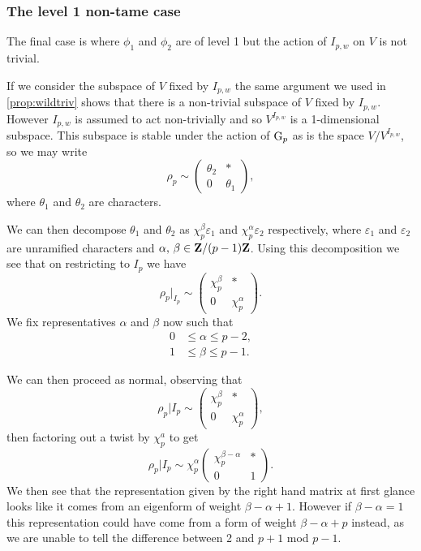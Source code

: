 \documentclass[a4paper,12pt]{article}
\begin{document}
\subsubsection{The level 1 non-tame case}\label{sec:l1nt}
The final case is where $\phi_1$ and $\phi_2$ are of level 1 but the action of $I_{p,w}$ on $V$ is not trivial.

If we consider the subspace of $V$ fixed by $I_{p,w}$ the same argument we used in \cref{prop:wildtriv} shows that there is a non-trivial subspace of $V$ fixed by $I_{p,w}$.
However $I_{p,w}$ is assumed to act non-trivially and so $V^{I_{p,w}}$ is a 1-dimensional subspace.
This subspace is stable under the action of $\mathrm{G}_p$ as is the space $V/V^{I_{p,w}}$, so we may write
\[
\rho_p \sim \begin{pmatrix}
\theta_2 & * \\
0        & \theta_1 \end{pmatrix},
\]
where $\theta_1$ and $\theta_2$ are characters.

We can then decompose $\theta_1$ and $\theta_2$ as $\chi_p^\beta \varepsilon_1$ and $\chi_p^\alpha \varepsilon_2$ respectively, where $\varepsilon_1$ and $\varepsilon_2$ are unramified characters and $\alpha,\,\beta \in \mathbf{Z}/(p-1)\mathbf{Z}$.
Using this decomposition we see that on restricting to $I_p$ we have
\[
\rho_p|_{I_p} \sim \begin{pmatrix}
\chi_p^\beta & * \\
0          & \chi_p^\alpha \end{pmatrix}.
\]
We fix representatives $\alpha$ and $\beta$ now such that
\begin{align*}
0&\le \alpha \le p - 2,\\
1&\le \beta \le p - 1.
\end{align*}

We can then proceed as normal, observing that
\[
\rho_p|I_{p} \sim \begin{pmatrix}
\chi_p^\beta & * \\
0        & \chi_p^\alpha \end{pmatrix},
\]
then factoring out a twist by $\chi_p^a$ to get
\[
\rho_p|I_{p} \sim \chi_p^\alpha \begin{pmatrix}
\chi_p^{\beta - \alpha}& * \\
0        & 1 \end{pmatrix}.
\]
We then see that the representation given by the right hand matrix at first glance looks like it comes from an eigenform of weight $\beta - \alpha + 1$.
However if $\beta - \alpha = 1$ this representation could have come from a form of weight $\beta - \alpha + p$ instead, as we are unable to tell the difference between 2 and $p + 1$ mod $p -1$.
\end{document}
